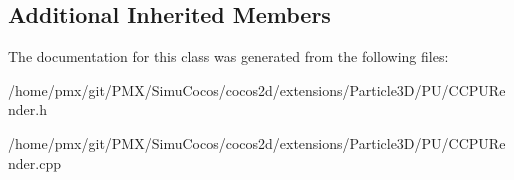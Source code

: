 \subsection*{Additional Inherited Members}


The documentation for this class was generated from the following files\+:\begin{DoxyCompactItemize}
\item 
/home/pmx/git/\+P\+M\+X/\+Simu\+Cocos/cocos2d/extensions/\+Particle3\+D/\+P\+U/C\+C\+P\+U\+Render.\+h\item 
/home/pmx/git/\+P\+M\+X/\+Simu\+Cocos/cocos2d/extensions/\+Particle3\+D/\+P\+U/C\+C\+P\+U\+Render.\+cpp\end{DoxyCompactItemize}
